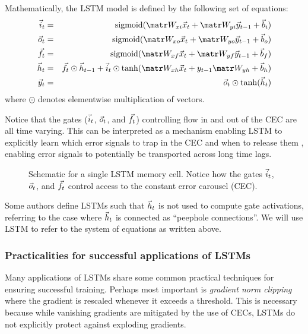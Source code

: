 Mathematically, the LSTM model is defined by the following set of equations:
\begin{align}
    \i_t &=& \sigmoid(\W_{xi} \x_t + \W_{yi} \y_{t-1} + \b_i) \\
    \o_t &=& \sigmoid(\W_{xo} \x_t + \W_{yo} \y_{t-1} + \b_o) \\
    \f_t &=& \sigmoid(\W_{xf} \x_t + \W_{yf} \y_{t-1} + \b_f) \\
    \h_t &=& \f_t \odot \h_{t-1} + \i_t \odot \tanh(\W_{xh}\x_t + y_{t-1} \W_{yh} + \b_h) \label{eq:lstm-dynamics} \\
    \y_t &=& \o_t \odot \tanh(\h_t)
\end{align}
where $\odot$ denotes elementwise multiplication of vectors.

Notice that the gates ($\vec{i}_t$, $\vec{o}_t$, and $\vec{f}_t$) controlling flow in and out
of the CEC are all time varying. This can be interpreted as a mechanism
enabling LSTM to explicitly learn which error signals to trap in the CEC and
when to release them \citep{hochreiter1997long}, enabling error signals to
potentially be transported across long time lags.

\begin{figure}[htpb]
    \centering
    
    \caption{Schematic for a single LSTM memory cell. Notice how the gates $\vec{i}_t$, $\vec{o}_t$, and $\vec{f}_t$ control access to the constant error carousel (CEC).}
    \label{fig:lstm-cell}
\end{figure}

Some authors define LSTMs such that $\vec{h}_t$ is not used to compute gate
activations, referring to the case where $\vec{h}_t$ is connected as ``peephole
connections''\citep{gers2000recurrent}. We will use LSTM to refer to the
system of equations as written above.

\subsubsection{Practicalities for successful applications of LSTMs}

Many applications of LSTMs  share some common practical
techniques for ensuring successful training. Perhaps most important is
\emph{gradient norm clipping} \citep{Mikolov2012,Pascanu2012} where the
gradient is rescaled whenever it exceeds a threshold. This is necessary because
while vanishing gradients are mitigated by the use of CECs, LSTMs do not
explicitly protect against exploding gradients.

